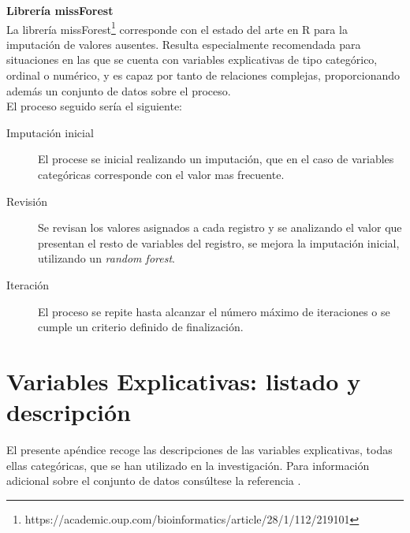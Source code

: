 \documentclass[a4paper, 11pt]{article}
\begin{document}
\colorbox{gray!30}{
\begin{minipage}{\textwidth}
\textbf{Librería missForest}\\
  La librería missForest\footnote{https://academic.oup.com/bioinformatics/article/28/1/112/219101}
  corresponde con el estado del arte en R para la imputación de valores
  ausentes. Resulta especialmente recomendada para situaciones en las que se cuenta con variables
  explicativas de tipo categórico, ordinal o numérico, y es capaz por tanto de relaciones complejas,
  proporcionando además un conjunto de datos sobre el proceso.\\

  El proceso seguido sería el siguiente:
  \begin{description}
      \item[Imputación inicial] El procese se inicial realizando un imputación, que en el caso  
      de variables categóricas corresponde con el valor mas frecuente.
      \item[Revisión] Se revisan los valores asignados a cada registro y se analizando el valor
      que presentan el resto de variables del registro, se mejora la imputación inicial, utilizando
      un \textit{random forest}.
      \item[Iteración] El proceso se repite hasta alcanzar el número máximo de iteraciones o se 
      cumple un criterio definido de finalización.
  \end{description}
\end{minipage}
}


\section{Variables Explicativas: listado y descripción}
\label{features_description}
El presente apéndice recoge las descripciones de las variables explicativas, todas ellas categóricas, 
que se han utilizado en la investigación. Para información adicional sobre el conjunto de datos 
consúltese la referencia \cite{NFCS01}.
\end{document}
